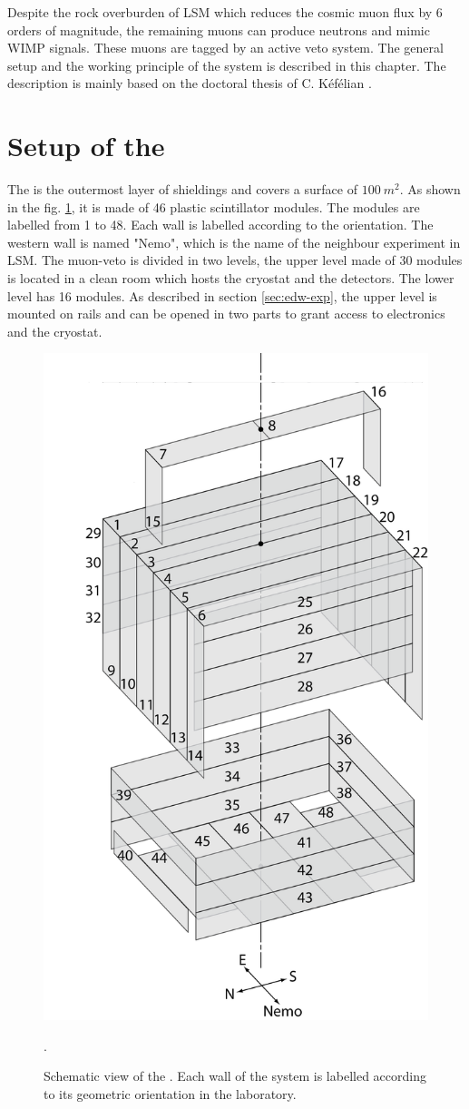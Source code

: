 Despite the rock overburden of LSM which reduces the cosmic muon flux by 6 orders of magnitude, the remaining muons can produce neutrons and mimic WIMP signals. These muons are tagged by an active veto system. The general setup and the working principle of the system is described in this chapter. The description is mainly based on the doctoral thesis of C. K{\'{e}}f{\'{e}}lian \cite{Kef16}.



\section{Setup of the \mvs}
\label{sec:muon-setup}

The \mvs is the outermost layer of shieldings and covers a surface of $\SI{100}{m^{2}}$. As shown in the fig. \ref{fig:muon-setup}, it is made of 46 plastic scintillator modules. The modules are labelled from 1 to 48. Each wall is labelled according to the orientation. The western wall is named "Nemo", which is the name of the neighbour experiment in LSM.
The muon-veto is divided in two levels, the upper level made of 30 modules is located in a clean room which hosts the cryostat and the detectors. The lower level has 16 modules. As described in section \ref{sec:edw-exp}, the upper level is mounted on rails and can be opened in two parts to grant access to electronics and the cryostat.

\begin{figure}[ht!]
  \centering
  \includegraphics[width=0.5\textwidth{}]{./fig/Veto.png}
  \caption{Schematic view of the \mvs. Each wall of the system is labelled according to its geometric orientation in the laboratory. }.
  \label{fig:muon-setup}
\end{figure}

